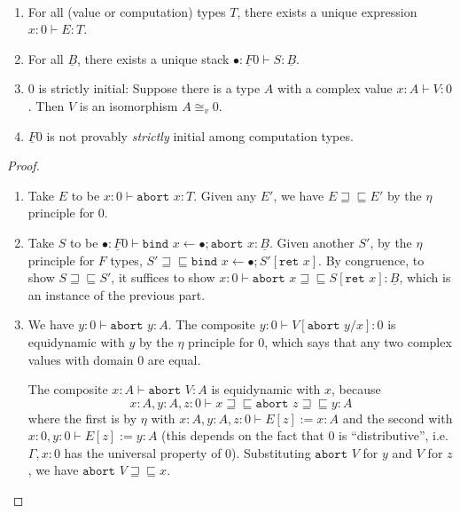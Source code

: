 \documentclass[acmsmall,nonacm]{acmart}
\renewcommand{\u}{\underline}
\newcommand{\ltdyn}{\sqsubseteq}
\newcommand{\gtdyn}{\sqsupseteq}
\newcommand{\equidyn}{\mathrel{\gtdyn\ltdyn}}
\newcommand{\bindXtoYinZ}[2]{\kw{bind}#2 \leftarrow #1;}
\newcommand{\kw}[1]{\texttt{#1}\,\,}
\newcommand{\ret}{\kw{ret}}
\newcommand{\abort}{\kw {abort}}
\begin{document}
\begin{longonly}
\begin{lemma} ~ \label{lem:initial}
  \begin{enumerate}
  \item For all (value or computation) types $T$, there exists a unique
    expression $x : 0 \vdash E : T$.
  \item For all $\u B$, there exists a unique stack $\bullet : \u F 0
    \vdash S : \u B$.
  \item
    0 is strictly initial: Suppose there is a type $A$ with a complex
    value $x : A \vdash V : 0$.  Then $V$ is an isomorphism $A \cong_v
    0$.

  \item $\u F 0$ is not provably \emph{strictly} initial among computation types.
  \end{enumerate}
\end{lemma}
\begin{proof}~
    \begin{enumerate}
    \item Take $E$ to be $x : 0 \vdash \abort{x} : T$.  Given any $E'$,
      we have $E \equidyn E'$ by the $\eta$ principle for $0$.

    \item Take $S$ to be $\bullet : \u F 0 \vdash
      \bindXtoYinZ{\bullet}{x}{\abort{x}} : \u B$.  Given another $S'$,
      by the $\eta$ principle for $F$ types, $S' \equidyn
      \bindXtoYinZ{\bullet}{x}{S'[\ret x]}$.  By congruence, to show $S
      \equidyn S'$, it suffices to show $x : 0 \vdash \abort{x} \equidyn
      S[\ret{x}] : \u B$, which is an instance of the previous part.
      
    \item 
      We have $y : 0 \vdash \abort{y} : A$.  The composite $y : 0 \vdash
      V[\abort{y}/x] : 0$ is equidynamic with $y$ by the $\eta$
      principle for $0$, which says that any two complex values with
      domain $0$ are equal.
  
      The composite $x : A \vdash \abort{V} : A$ is equidynamic
      with $x$, because 
  \[
  x : A, y : A, z : 0 \vdash x \equidyn \abort{z} \equidyn y : A
  \]
  where the first is by $\eta$ with $x : A, y : A, z : 0 \vdash E[z] :=
  x : A$ and the second with $x : 0, y : 0 \vdash E[z] := y : A$ (this
  depends on the fact that $0$ is ``distributive'', i.e. $\Gamma,x:0$
  has the universal property of $0$).  Substituting $\abort{V}$ for $y$
  and $V$ for $z$, we have $\abort{V} \equidyn x$.


\end{enumerate}
\end{proof}
\end{longonly}
\end{document}

